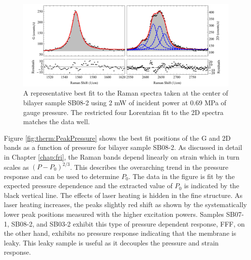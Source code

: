 \begin{figure}
	\begin{center}
	\includegraphics[scale=0.6]{Figs_Thermal/0_3mW.pdf}
	\end{center}
	\caption[Representative fit to Raman spectra for thermal conductivity measurements]{\label{fig:therm:spec}
		A representative best fit to the Raman spectra taken at the center of bilayer sample SB08-2 using 2 mW of incident power at 0.69 MPa of gauge pressure.
		The restricted four Lorentzian fit to the 2D spectra matches the data well.
	}
\end{figure}

Figure \ref{fig:therm:PeakPressure} shows the best fit positions of the G and 2D bands as a function of pressure for bilayer sample SB08-2.
As discussed in detail in Chapter \ref{chap:fri}, the Raman bands depend linearly on strain which in turn scales as $(P-P_0)^{2/3}$.
This describes the overarching trend in the pressure response and can be used to determine $P_0$.
The data in the figure is fit by the expected pressure dependence and the extracted value of $P_0$ is indicated by the black vertical line.
The effects of laser heating is hidden in the fine structure.
As laser heating increases, the peaks slightly red shift as shown by the systematically lower peak positions measured with the higher excitation powers.
Samples SB07-1, SB08-2, and SB03-2 exhibit this type of pressure dependent response, FFF, on the other hand, exhibits no pressure response indicating that the membrane is leaky.
This leaky sample is useful as it decouples the pressure and strain response.

